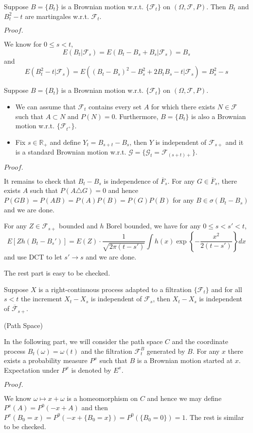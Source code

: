 \documentclass{article}
\newcommand{\Pf}[1]{$Proof.$\par}
\newcommand{\F}{\mathcal{F}}
\begin{document}
\begin{proposition}
    Suppose $B = \{B_t\}$ is a Brownian motion w.r.t. $\{\F_t\}$ on $(\Omega,\F,P)$. Then $B_t$ and $B_t^2 - t$ are martingales w.r.t. $\F_t$.
\end{proposition}
\Pf\par
    We know for $0\leq s <t$,
    \[E(B_t|\F_s) = E(B_t-B_s+B_s|\F_s) = B_s\]
    and
    \[
    E(B_t^2 -t|\F_s) = E((B_t-B_s)^2 -B_s^2 + 2B_tB_s -t|\F_s) = B_s^2 - s
    \]

\begin{proposition}
    Suppose $B = \{B_t\}$ is a Brownian motion w.r.t. $\{\F_t\}$ on $(\Omega,\F,P)$.\par
    \begin{itemize}
        \item We can assume that $\F_t$ contains every set $A$ for which there exists $N\in \F$ such that $A\subset N$ and $P(N) =0$. Furthermore, $B= \{B_t\}$ is also a Brownian motion w.r.t. $\{\F_{t^+}\}$.
        \item Fix $s\in \mathbb{R}_+$ and define $Y_t = B_{s+t}-B_s$, then $Y$ is independent of $\F_{s+}$ and it is a standard Brownian motion w.r.t. $\mathcal{G} = \{\mathcal{G}_{t} = \F_{(s+t)+}\}$.
    \end{itemize}
\end{proposition}
\Pf\par
    It remains to check that $B_t - B_s$ is independence of $\overline{F}_{s}$. For any $G \in \overline{F}_{s}$, there exists $A$ such that $P(A\triangle G) = 0$ and hence $P(GB) = P(AB) = P(A)P(B) = P(G)P(B)$ for any $B\in \sigma(B_t-B_s)$ and we are done.\par
    For any $Z\in \F_{s+}$ bounded and $h$ Borel bounded, we have for any $0\leq s < s' <t$,
    \[E[Zh(B_t-B_s')] = E(Z)\cdot\dfrac{1}{\sqrt{2\pi(t-s')}}\int h(x)\exp\left\{-\dfrac{x^2}{2(t-s')}\right\}dx\]
    and use DCT to let $s'\to s$ and we are done.\par
    The rest part is easy to be checked.

\begin{lemma}
    Suppose $X$ is a right-continuous process adapted to a filtration $\{\F_t\}$ and for all $s<t$ the increment $X_t-X_s$ is independent of $\F_s$, then $X_t - X_s$ is independent of $\overline{\F}_{s+}$.
\end{lemma}

\begin{definition}(Path Space)\par
    In the following part, we will consider the path space $C$
and the coordinate process $B_t(\omega) = \omega(t)$ and the filtration $\F_t^B$ generated by $B$. For any $x$ there exists a probability measure $P^x$ such that $B$ is a Brownian motion started at $x$. Expectation under $P^x$ is denoted by $E^x$. 
\end{definition}
\Pf\par
We know $\omega \mapsto x+\omega$ is a homeomorphism on $C$ and hence we may define $P^x(A) = P^0(-x+A)$ and then $P^x(B_0 = x) = P^0(-x+\{B_0 = x\}) = P^0(\{B_0 = 0\}) = 1$. The rest is similar to be checked.
\end{document}
